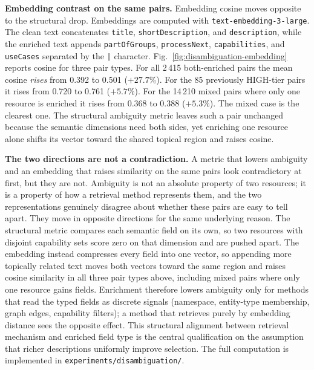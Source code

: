 \textbf{Embedding contrast on the same pairs.} Embedding cosine moves opposite to the structural drop. Embeddings are computed with \texttt{text-embedding-3-large}. The clean text concatenates \texttt{title}, \texttt{shortDescription}, and \texttt{description}, while the enriched text appends \texttt{partOfGroups}, \texttt{processNext}, \texttt{capabilities}, and \texttt{useCases} separated by the \texttt{|} character. Fig.~\ref{fig:disambiguation-embedding} reports cosine for three pair types. For all 2\,415 both-enriched pairs the mean cosine \emph{rises} from 0.392 to 0.501 ($+27.7\%$). For the 85 previously HIGH-tier pairs it rises from 0.720 to 0.761 ($+5.7\%$). For the 14\,210 mixed pairs where only one resource is enriched it rises from 0.368 to 0.388 ($+5.3\%$). The mixed case is the clearest one. The structural ambiguity metric leaves such a pair unchanged because the semantic dimensions need both sides, yet enriching one resource alone shifts its vector toward the shared topical region and raises cosine.


\textbf{The two directions are not a contradiction.} A metric that lowers ambiguity and an embedding that raises similarity on the same pairs look contradictory at first, but they are not. Ambiguity is not an absolute property of two resources; it is a property of how a retrieval method represents them, and the two representations genuinely disagree about whether these pairs are easy to tell apart. They move in opposite directions for the same underlying reason. The structural metric compares each semantic field on its own, so two resources with disjoint capability sets score zero on that dimension and are pushed apart. The embedding instead compresses every field into one vector, so appending more topically related text moves both vectors toward the same region and raises cosine similarity in all three pair types above, including mixed pairs where only one resource gains fields. Enrichment therefore lowers ambiguity only for methods that read the typed fields as discrete signals (namespace, entity-type membership, graph edges, capability filters); a method that retrieves purely by embedding distance sees the opposite effect. This structural alignment between retrieval mechanism and enriched field type is the central qualification on the assumption that richer descriptions uniformly improve selection. The full computation is implemented in \texttt{experiments/disambiguation/}.
